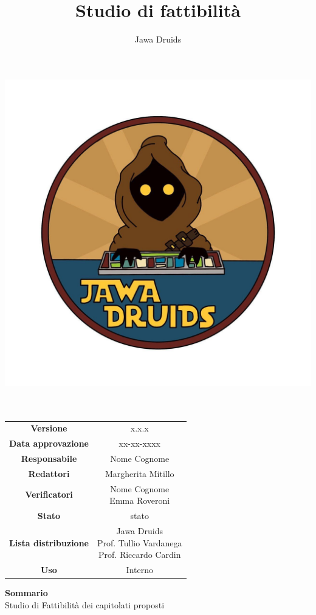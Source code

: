 \documentclass[a4paper,12pt]{report}
\begin{document}
\makeatletter
\begin{titlepage}
	\begin{center}
	\vspace*{-4,0cm}
	\author{Jawa Druids}
	\title{Studio di fattibilità}
	\date{}
	\includegraphics[width=0.7\linewidth]{../immagini/DRUIDSLOGO.jpg}\\[4ex]
	{\huge \bfseries  \@title }\\[2ex] 
	{\LARGE  \@author}\\[50ex]
	\vspace*{-8,0cm}
	\begin{table}[H]
		\centering
		\begin{tabular}{c|c}
			\textbf{Versione} & x.x.x \\
			\textbf{Data approvazione} & xx-xx-xxxx\\
			\textbf{Responsabile} & Nome Cognome\\
			\textbf{Redattori} & Margherita Mitillo \\
			\textbf{Verificatori} & \makecell{ Nome Cognome \\ Emma Roveroni} \\
			\textbf{Stato} & stato\\
			\textbf{Lista distribuzione} & \makecell{Jawa Druids \\ Prof. Tullio Vardanega \\ Prof. Riccardo Cardin}\\
			\textbf{Uso} & Interno			
		\end{tabular}
	\end{table}
	\fontsize{17}{12}\textbf{Sommario} \\
	Studio di Fattibilità dei capitolati proposti
	\end{center}
\end{titlepage}
\makeatother


	
\tableofcontents{}










\end{document}
